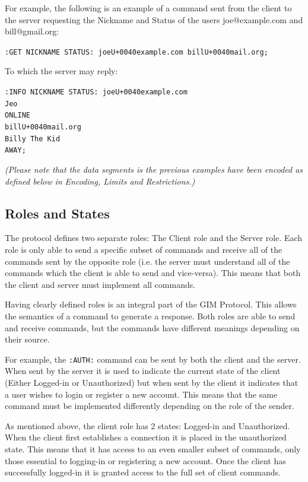 For example, the following is an example of a command sent from the client to the server requesting the Nickname and Status of the users joe@example.com and bill@gmail.org:

\texttt{:GET NICKNAME STATUS: joe\SLASH U+0040example.com bill\SLASH U+0040mail.org;}

To which the server may reply:

\texttt{:INFO NICKNAME STATUS: joe\SLASH U+0040example.com\\
Jeo\\
ONLINE\\
bill\SLASH U+0040mail.org\\
Billy The Kid\\
AWAY;}

\emph{(Please note that the data segments is the previous examples have been encoded as defined below in Encoding, Limits and Restrictions.)}

\subsection{Roles and States}

The protocol defines two separate roles: The Client role and the Server role. Each role is only able to send a specific subset of commands and receive all of the commands sent by the opposite role (i.e. the server must understand all of the commands which the client is able to send and vice-versa). This means that both the client and server must implement all commands.

Having clearly defined roles is an integral part of the GIM Protocol. This allows the semantics of a command to generate a response. Both roles are able to send and receive commands, but the commands have different meanings depending on their source. 

For example, the \texttt{:AUTH:} command can be sent by both the client and the server. When sent by the server it is used to indicate the current state of the client (Either Logged-in or Unauthorized) but when sent by the client it indicates that a user wishes to login or register a new account. This means that the same command must be implemented differently depending on the role of the sender.

As mentioned above, the client role has 2 states: Logged-in and Unauthorized. When the client first establishes a connection it is placed in the unauthorized state. This means that it has access to an even smaller subset of commands, only those essential to logging-in or registering a new account. Once the client has successfully logged-in it is granted access to the full set of client commands.


